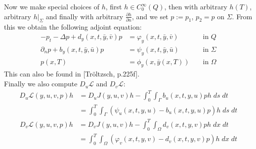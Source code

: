\documentclass[
12pt, %
a4paper, %
onecolumn, %
portrait %
]{article}
\begin{document}
Now we make special choices of $h$, first $h \in C_0^\infty(Q)$, then with arbitrary $h(T)$, arbitrary $h|_\Sigma$  and finally with arbitrary $\frac{\partial h}{\partial n}$, and we set $p := p_1$, $p_2 = p$ on $\Sigma$. From this we obtain the following adjoint equation:
\begin{equation}
\begin{alignedat}{2}
-p_t - \Delta p + d_y(x,t,\bar{y}, \bar{v}) p &= \varphi_y(x,t,\bar{y}, \bar{v}) &&\text{ in } Q \\
\partial_n p + b_y(x,t,\bar{y}, \bar{u}) p &= \psi_y(x,t,\bar{y}, \bar{u}) &&\text{ in } \Sigma \\
p(x,T) &= \phi_y(x, \bar{y}(x,T)) &&\text{ in } \Omega
\label{eq:adjoint-pde}
\end{alignedat}
\end{equation}
This can also be found in [Tr\"oltzsch, p.225f].\\
Finally we also compute $D_u \mathcal{L}$ and $D_v \mathcal{L}$:
\begin{align*}
D_u \mathcal{L}(y,u,v, p) h & = D_u J(y,u,v) h - \int_{0}^{T} \int_{\Gamma} b_u(x,t,y,u) p h \; ds \; dt \\
& = \int_{0}^{T} \int_{\Gamma}  (\psi_u(x,t,y,u) -  b_u(x,t,y,u) p)  h \; ds \; dt
\end{align*}
\begin{align*}
D_v \mathcal{L}(y,u,v, p) h & = D_v J(y,u,v) h - \int_{0}^{T} \int_{\Omega} d_v(x,t,y,v) p h \; dx \; dt \\
& = \int_{0}^{T} \int_{\Omega}  (\varphi_v(x,t,y,v) -  d_v(x,t,y,v) p)  h \; dx \; dt
\end{align*}
\end{document}
